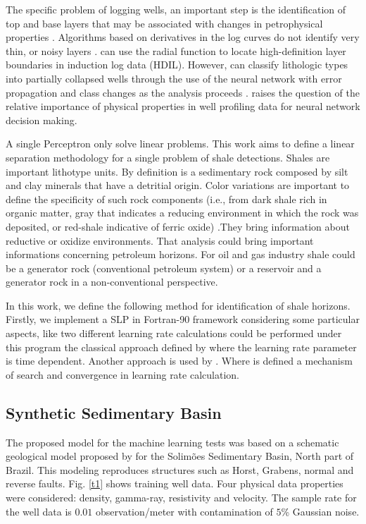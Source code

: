 \documentclass{cilamce19}
\begin{document}
   The specific problem of logging wells, an important step is the identification of top and base layers that may be associated with changes in petrophysical properties \citet{Saljooghi2014}. Algorithms based on derivatives in the log curves do not identify very thin, or noisy layers \citet{Zhang1999}. \citet{Chakravarthy1999} can use the radial function to locate high-definition layer boundaries in induction log data (HDIL). However, \citet{Benaouda1999} can classify lithologic types into partially collapsed wells through the use of the neural network with error propagation and class changes as the analysis proceeds \citet{Poulton2002}. \citet{Gloaguen2017} raises the question of the relative importance of physical properties in well profiling data for neural network decision making.
   
   A single Perceptron only solve linear problems. This work aims to define a linear separation methodology for a single problem of shale detections. Shales are important lithotype units. By definition is a sedimentary rock composed by silt and clay minerals that have a detritial origin.  Color variations are important to define the specificity of such rock components (i.e., from dark shale rich in organic matter, gray that indicates a reducing environment in which the rock was deposited, or red-shale indicative of ferric oxide) .They bring information about reductive or oxidize environments. That analysis  could bring important informations concerning petroleum horizons. For oil and gas industry shale could be a generator rock (conventional petroleum system) or a reservoir and a generator rock  in a non-conventional perspective. 
   
   
   In this work, we define the following method for identification of shale horizons. Firstly, we implement a SLP in Fortran-90 framework considering some particular aspects, like two different learning rate calculations could be performed under this program the classical approach defined by \citet{Robbins1951} where the learning rate parameter is time dependent. Another approach is used by \citet{Darken1990}. Where  is defined a mechanism of search and convergence in learning rate calculation. 

\subsection{Synthetic Sedimentary Basin}

The proposed model for the machine learning tests was based on a schematic geological model proposed by  \citet{Sal2008} for the Solim\~oes Sedimentary Basin, North part of Brazil. This modeling reproduces structures such as Horst, Grabens, normal and reverse faults. Fig. \ref{t1} shows training well data. Four physical data properties were considered: density, gamma-ray, resistivity and velocity. The sample rate for the well data is $0.01$ observation/meter with contamination of $5$\% Gaussian noise.
\end{document}
